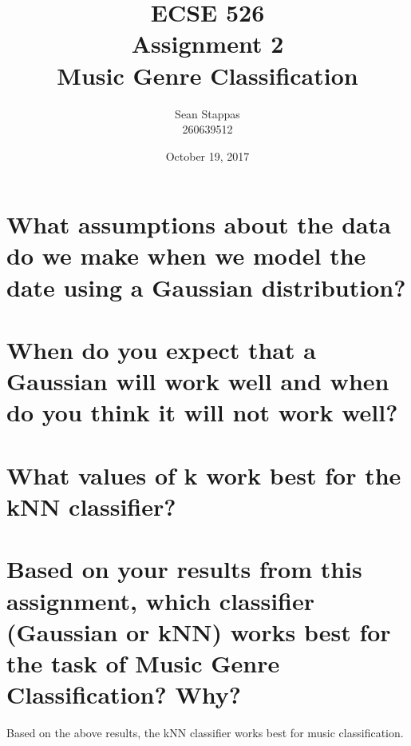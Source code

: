 \documentclass[a4paper,titlepage]{article}
\title{
	\textbf{ECSE 526 \\ Assignment 2}
	\\ \large Music Genre Classification
}
\author{Sean Stappas \\ 260639512}
\date{October 19, 2017}
\begin{document}
	\sloppy
	\maketitle
	\twocolumn
	
	\section{What assumptions about the data do we make when we model the date using a Gaussian distribution?}
	
	
	\section{When do you expect that a Gaussian will work well and when do you think it will not work well?}
	
	\section{What values of k work best for the kNN classifier?}
	
	\section{Based on your results from this assignment, which classifier (Gaussian or kNN) works best for the task of Music Genre Classification? Why?}
	
	Based on the above results, the kNN classifier works best for music classification.
	
	
	
\end{document}
